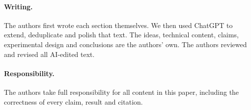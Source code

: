 \documentclass[letterpaper,twocolumn,10pt]{article}
\newif\ifappendix
\begin{document}
\paragraph{Writing.}
The authors first wrote each section themselves. We then used ChatGPT to
extend, deduplicate and polish that text. The ideas, technical content, claims,
experimental design and conclusions are the authors' own. The authors reviewed
and revised all AI-edited text.

\paragraph{Responsibility.}
The authors take full responsibility for all content in this paper, including
the correctness of every claim, result and citation.




\ifappendix
\clearpage
\onecolumn
\appendix

\fi
\end{document}
